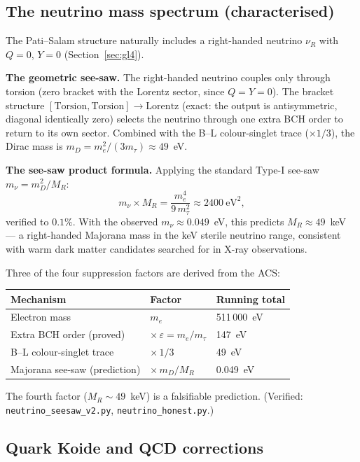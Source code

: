 \documentclass[11pt,a4paper]{article}
\theoremstyle{plain}
\theoremstyle{definition}
\theoremstyle{remark}
\begin{document}
\subsection{The neutrino mass spectrum (characterised)}

The Pati--Salam structure naturally includes a right-handed neutrino
$\nu_R$ with $Q = 0$, $Y = 0$ (Section~\ref{sec:gl4}).

\textbf{The geometric see-saw.}
The right-handed neutrino couples only through torsion (zero bracket
with the Lorentz sector, since $Q = Y = 0$).  The bracket structure
$[\mathrm{Torsion}, \mathrm{Torsion}] \to \mathrm{Lorentz}$ (exact:
the output is antisymmetric, diagonal identically zero) selects the
neutrino through one extra BCH order to return to its own sector.
Combined with the B--L colour-singlet trace ($\times 1/3$), the
Dirac mass is $m_D = m_e^2/(3m_\tau) \approx 49$~eV.

\textbf{The see-saw product formula.}
Applying the standard Type-I see-saw $m_\nu = m_D^2/M_R$:
\begin{equation}\label{eq:seesaw-product}
  m_\nu \times M_R = \frac{m_e^4}{9\,m_\tau^2} \approx 2400~\mathrm{eV}^2,
\end{equation}
verified to $0.1\%$.  With the observed $m_\nu \approx 0.049$~eV,
this predicts $M_R \approx 49$~keV --- a right-handed Majorana mass
in the keV sterile neutrino range, consistent with warm dark matter
candidates searched for in X-ray observations.

Three of the four suppression factors are derived from the ACS:
\begin{center}
\begin{tabular}{lll}
\toprule
Mechanism & Factor & Running total \\
\midrule
Electron mass & $m_e$ & 511\,000~eV \\
Extra BCH order (proved) & $\times\,\varepsilon = m_e/m_\tau$ & 147~eV \\
B--L colour-singlet trace & $\times\,1/3$ & 49~eV \\
Majorana see-saw (prediction) & $\times\,m_D/M_R$ & 0.049~eV \\
\bottomrule
\end{tabular}
\end{center}
The fourth factor ($M_R \sim 49$~keV) is a falsifiable prediction.
(Verified: \texttt{neutrino\_seesaw\_v2.py}, \texttt{neutrino\_honest.py}.)

\subsection{Quark Koide and QCD corrections}
\end{document}
